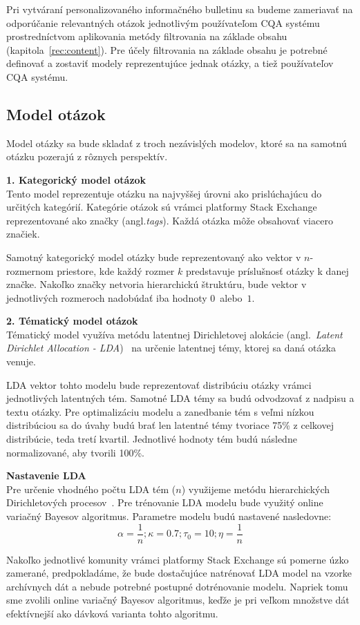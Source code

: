 Pri vytváraní personalizovaného informačného bulletinu sa budeme zameriavať na odporúčanie relevantných otázok jednotlivým
používateľom CQA systému prostredníctvom aplikovania metódy filtrovania na základe obsahu (kapitola~\ref{rec:content}).
Pre účely filtrovania na základe obsahu je potrebné definovať a zostaviť modely reprezentujúce jednak otázky, a tiež
používateľov CQA systému.

\subsection{Model otázok}

Model otázky sa bude skladať z troch nezávislých modelov, ktoré sa na samotnú otázku pozerajú z rôznych perspektív.

\textbf{1. Kategorický model otázok}\\
Tento model reprezentuje otázku na najvyššej úrovni ako prislúchajúcu do určitých kategórií. Kategórie otázok sú vrámci
platformy Stack Exchange reprezentované ako značky (angl.\textit{tags}). Každá otázka môže obsahovať viacero značiek.

Samotný kategorický model otázky bude reprezentovaný ako vektor v $n$-rozmernom priestore, kde každý rozmer $k$
predstavuje príslušnosť otázky k danej značke. Nakoľko značky netvoria hierarchickú štruktúru, bude vektor v jednotlivých
rozmeroch nadobúdať iba hodnoty $0$~alebo~$1$.

\textbf{2. Tématický model otázok}\\
Tématický model využíva metódu latentnej Dirichletovej alokácie (angl.~\emph{Latent Dirichlet Allocation - LDA})~\cite{blei2003latent}
na určenie latentnej témy, ktorej sa daná otázka venuje.

LDA vektor tohto modelu bude reprezentovať distribúciu otázky vrámci jednotlivých latentných tém.
Samotné LDA témy sa budú odvodzovať z nadpisu a textu otázky.
Pre optimalizáciu modelu a zanedbanie tém s veľmi nízkou distribúciou sa do úvahy budú brať len latentné témy tvoriace
75\% z celkovej distribúcie, teda tretí kvartil. Jednotlivé hodnoty tém budú následne normalizované, aby tvorili 100\%.

\begin{adjustwidth}{1cm}{1cm}
\textbf{Nastavenie LDA}\\
Pre určenie vhodného počtu LDA tém ($n$) využijeme metódu hierarchických Dirichletových procesov~\cite{Teh2006}.
Pre trénovanie LDA modelu bude využitý online variačný Bayesov algoritmus. Parametre modelu budú nastavené nasledovne:\\
$$\alpha = \frac{1}{n}; \kappa = 0.7; \tau_0 = 10; \eta = \frac{1}{n}$$

Nakoľko jednotlivé komunity vrámci platformy Stack Exchange sú pomerne úzko zamerané, predpokladáme, že bude dostačujúce
natrénovať LDA model na vzorke archívnych dát a nebude potrebné postupné dotrénovanie modelu. Napriek tomu sme zvolili
online variačný Bayesov algoritmus, keďže je pri veľkom množstve dát efektívnejší ako dávková varianta tohto algoritmu.
\end{adjustwidth}

